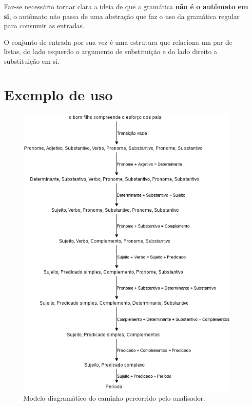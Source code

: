 \documentclass[12pt,a4paper,oneside,english,brazilian,brazil]{abntex2}
\begin{document}
\par Faz-se necessário tornar clara a ideia de que a gramática \textbf{não é o autômato em si}, o autômato não passa de uma abstração que faz o uso da gramática regular para consumir as entradas. \

\par O conjunto de entrada por sua vez é uma estrutura que relaciona um par de listas, do lado esquerdo o argumento de substituição e do lado direito a substituição em si. \

\section{Exemplo de uso}

\vspace{1cm}
\begin{figure}[H]
\centering
\includegraphics[scale=0.7]{Imagens/analise.png}
\caption{Modelo diagramático do caminho percorrido pelo analisador.}
\end{figure}
\end{document}
